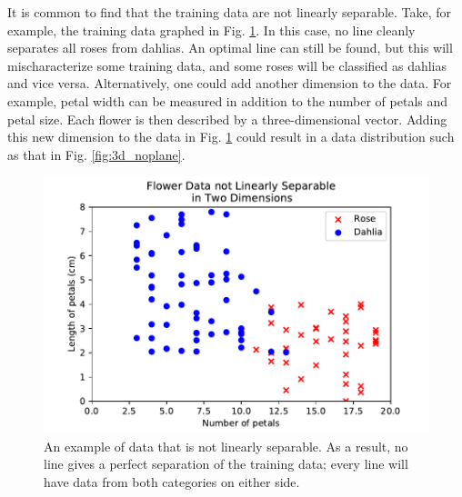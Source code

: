 \documentclass[%
 reprint,
nofootinbib,
 amsmath,amssymb,
 aps,
]{revtex4-2}
\begin{document}
It is common to find that the training data are not linearly separable. Take, for example, the training data graphed in Fig. \ref{fig:3d_line}. In this case, no line cleanly separates all roses from dahlias. An optimal line can still be found, but this will mischaracterize some training data, and some roses will be classified as dahlias and vice versa. Alternatively, one could add another dimension to the data. For example, petal width can be measured in addition to the number of petals and petal size. Each flower is then described by a three-dimensional vector. Adding this new dimension to the data in Fig. \ref{fig:3d_line} could result in a data distribution such as that in Fig. \ref{fig:3d_noplane}.

\begin{figure}
    \includegraphics[width=\linewidth]{Figures/3d_line.pdf}
    \caption{\label{fig:3d_line}An example of data that is not linearly separable. As a result, no line gives a perfect separation of the training data; every line will have data from both categories on either side.}
\end{figure}
\end{document}
